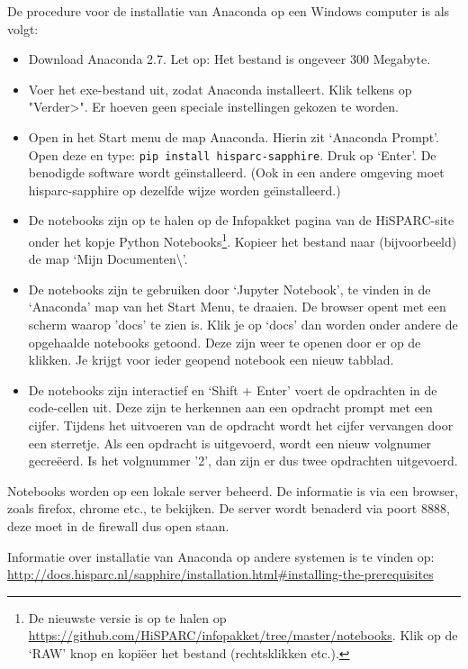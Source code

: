 De procedure voor de installatie van Anaconda op een Windows computer is als volgt:
\begin{itemize}
\item Download Anaconda 2.7. Let op: Het bestand is ongeveer 300 Megabyte.
\item Voer het exe-bestand uit, zodat Anaconda installeert. Klik telkens op "Verder>". Er hoeven geen speciale
    instellingen gekozen te worden.
\item Open in het Start menu de map Anaconda. Hierin zit `Anaconda Prompt'. Open deze en type:
 {\tt pip install hisparc-sapphire}. Druk op `Enter'. De benodigde \hisparc software wordt ge\"\i nstalleerd.
 (Ook in een andere \python omgeving moet hisparc-sapphire op dezelfde wijze worden ge\"\i nstalleerd.)
\item De notebooks zijn op te halen op de Infopakket pagina 
van de HiSPARC-site onder het kopje Python Notebooks\footnote{De nieuwste versie is op te halen op 
\url{https://github.com/HiSPARC/infopakket/tree/master/notebooks}. Klik op de `RAW' knop en kopi\"{e}er het bestand 
(rechtsklikken etc.).}. Kopieer het bestand naar (bijvoorbeeld) de map `Mijn Documenten\textbackslash'. 
\item De notebooks zijn te gebruiken door `Jupyter Notebook', te vinden in de `Anaconda' map van het Start Menu, te draaien. De browser
opent met een scherm waarop 'docs' te zien is. Klik je op `docs' dan worden onder andere de opgehaalde notebooks
getoond. Deze zijn weer te openen door er op de klikken. Je krijgt voor ieder geopend notebook een nieuw tabblad.
\item De notebooks zijn interactief en `Shift + Enter' voert de opdrachten in de code-cellen uit. Deze zijn te herkennen aan
een opdracht prompt met een cijfer. Tijdens het uitvoeren van de opdracht wordt het cijfer vervangen door een sterretje. Als 
een opdracht is uitgevoerd, wordt een nieuw volgnumer gecre\"{e}erd. Is het volgnummer '2', dan zijn er dus twee opdrachten 
uitgevoerd.
\end{itemize}

Notebooks worden op een lokale server beheerd. De informatie is via een browser, zoals firefox, chrome etc., te bekijken. 
De server wordt benaderd via poort 8888, deze moet in de firewall dus open staan.

Informatie over installatie van Anaconda op andere systemen is te vinden op: \url{http://docs.hisparc.nl/sapphire/installation.html#installing-the-prerequisites} 



